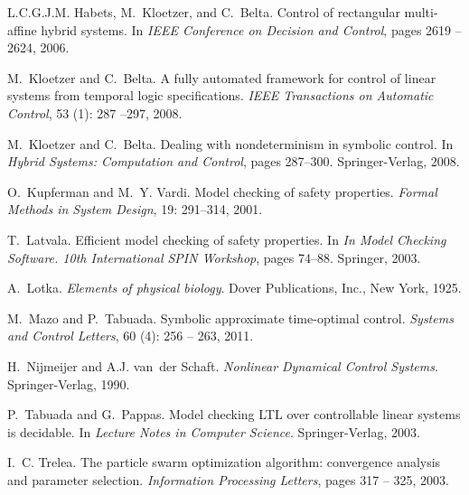 \documentclass{ifacconf}
\begin{document}
\begin{thebibliography}{21}
L.C.G.J.M. Habets, M.~Kloetzer, and C.~Belta.
\newblock Control of rectangular multi-affine hybrid systems.
\newblock In \emph{{IEEE} Conference on Decision and Control}, pages 2619
  --2624, 2006.

M.~Kloetzer and C.~Belta.
\newblock A fully automated framework for control of linear systems from
  temporal logic specifications.
\newblock \emph{IEEE Transactions on Automatic Control}, 53
  (1): 287 --297, 2008{}.

M.~Kloetzer and C.~Belta.
\newblock Dealing with nondeterminism in symbolic control.
\newblock In \emph{Hybrid Systems: Computation and Control}, pages 287--300.
  Springer-Verlag, 2008{}.

O.~Kupferman and M.~Y. Vardi.
\newblock Model checking of safety properties.
\newblock \emph{Formal Methods in System Design}, 19: 291--314, 2001.

T.~Latvala.
\newblock Efficient model checking of safety properties.
\newblock In \emph{In Model Checking Software. 10th International SPIN
  Workshop}, pages 74--88. Springer, 2003.

A.~Lotka.
\newblock \emph{Elements of physical biology}.
\newblock Dover Publications, Inc., New York, 1925.

M.~Mazo and P.~Tabuada.
\newblock Symbolic approximate time-optimal control.
\newblock \emph{Systems and Control Letters}, 60 (4): 256 --
  263, 2011.

H.~Nijmeijer and A.J. van~der Schaft.
\newblock \emph{Nonlinear Dynamical Control Systems}.
\newblock Springer-Verlag, 1990.

P.~Tabuada and G.~Pappas.
\newblock Model checking {LTL} over controllable linear systems is decidable.
\newblock In \emph{Lecture Notes in Computer Science}. Springer-Verlag, 2003.

I.~C. Trelea.
\newblock The particle swarm optimization algorithm: convergence analysis and
  parameter selection.
\newblock \emph{Information Processing Letters}, pages 317 -- 325, 2003.


\end{thebibliography}
\end{document}
